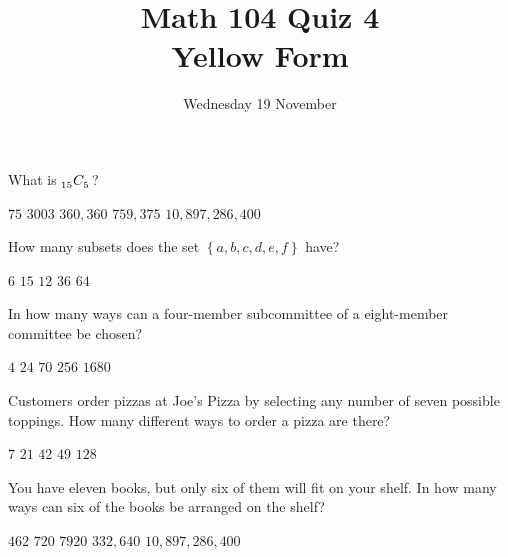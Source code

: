 \documentclass[answers,12pt]{exam}
\title{Math 104 Quiz 4\\Yellow Form}
\date{Wednesday 19 November}
\newcommand\ncr[2]{\tensor[_{#1}]C{_{#2}}}
\begin{document}
\maketitle
\begin{center}
\end{center}

\begin{questions}

\question What is $\ncr{15}{5}$?\\
\begin{oneparchoices}
\choice $75$ %
\correctchoice $3003$
\choice $360,360$ %
\choice $759,375$ %
\choice $10,897,286,400$ %
\end{oneparchoices}

\question How many subsets does the set
$\left\{a,b,c,d,e,f\right\}$ have?\\
\begin{oneparchoices}
\choice $6$ %
\choice $15$ %
\choice $12$ %
\choice $36$ %
\correctchoice $64$
\end{oneparchoices}

\question In how many ways can a four-member subcommittee
of a eight-member committee be chosen?\\
\begin{oneparchoices}
\choice $4$ %
\choice $24$ %
\correctchoice $70$
\choice $256$ %
\choice $1680$ %
\end{oneparchoices}

\question Customers order pizzas at Joe's Pizza
by selecting any number of seven possible toppings.
How many different ways to order a pizza are there?\\
\begin{oneparchoices}
\choice $7$ %
\choice $21$ %
\choice $42$ %
\choice $49$ %
\correctchoice $128$
\end{oneparchoices}

\question You have eleven books, but only six
of them will fit on your shelf. In how many 
ways can six of the books be arranged on the shelf?\\
\begin{oneparchoices}
\choice $462$ %
\choice $720$ %
\choice $7920$ %
\correctchoice $332,640$
\choice $10,897,286,400$ %
\end{oneparchoices}


\end{questions}
\end{document}
